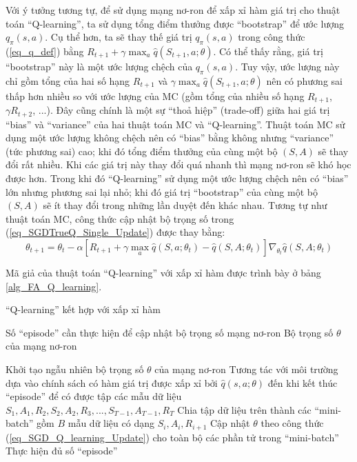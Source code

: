 	Với ý tưởng tương tự, để sử dụng mạng nơ-ron để xấp xỉ hàm giá trị cho thuật toán ``Q-learning'', ta sử dụng tổng điểm thưởng được ``bootstrap'' để ước lượng $q_{\pi}(s,a)$.
	Cụ thể hơn, ta sẽ thay thế giá trị $q_{\pi}(s,a)$ trong công thức (\ref{eq_q_def}) bằng $R_{t+1}+ \gamma \max_{a}\hat{q}(S_{t+1}, a;\theta)$.
	Có thể thấy rằng, giá trị ``bootstrap'' này là một ước lượng chệch của $q_{\pi}(s,a)$.
	Tuy vậy, ước lượng này chỉ gồm tổng của hai số hạng $R_{t+1}$ và $\gamma \max_{a}\hat{q}(S_{t+1}, a;\theta)$ nên có phương sai thấp hơn nhiều so với ước lượng của MC (gồm tổng của nhiều số hạng $R_{t+1}$, $\gamma R_{t+2}$, ...).
	Đây cũng chính là một sự ``thoả hiệp'' (trade-off) giữa hai giá trị ``bias'' và ``variance'' của hai thuật toán MC và ``Q-learning''.
	Thuật toán MC sử dụng một ước lượng không chệch nên có ``bias'' bằng không nhưng ``variance'' (tức phương sai) cao; khi đó tổng điểm thưởng của cùng một bộ $(S, A)$ sẽ thay đổi rất nhiều.
	Khi các giá trị này thay đổi quá nhanh thì mạng nơ-ron sẽ khó học được hơn.
	Trong khi đó ``Q-learning'' sử dụng một ước lượng chệch nên có ``bias'' lớn nhưng phương sai lại nhỏ; khi đó giá trị ``bootstrap'' của cùng một bộ $(S, A)$ sẽ ít thay đổi trong những lần duyệt đến khác nhau.
	Tương tự như thuật toán MC, công thức cập nhật bộ trọng số trong (\ref{eq_SGDTrueQ_Single_Update}) được thay bằng:
	\begin{equation}
		\label{eq_SGD_Q_learning_Update}
		\theta_{t+1} = \theta_t - \alpha \left[ R_{t+1} + \gamma \max_{a}\hat{q}(S, a;\theta_t) - \hat{q}(S,A;\theta_t) \right] \nabla_{\theta_t} \hat{q}(S, A;\theta_t)	
	\end{equation}
	
	Mã giả của thuật toán ``Q-learning'' với xấp xỉ hàm được trình bày ở bảng \ref{alg_FA_Q_learning}.
	\begin{algorithm}
		\caption{``Q-learning'' kết hợp với xấp xỉ hàm}
		\label{alg_FA_Q_learning}
		\begin{algorithmic}[1]
			\renewcommand{\algorithmicrequire}{\textbf{Đầu vào:}}
			\renewcommand{\algorithmicensure}{\textbf{Đầu ra:}}
			\algnewcommand{}
			\algnewcommand\Operation{\item[\algorithmicoperation]}
			
			\Require Số ``episode'' cần thực hiện để cập nhật bộ trọng số mạng nơ-ron
			\Ensure Bộ trọng số $\theta$ của mạng nơ-ron
			
			\Operation
			\State Khởi tạo ngẫu nhiên bộ trọng số $\theta$ của mạng nơ-ron
			\Repeat
				\State Tương tác với môi trường dựa vào chính sách có hàm giá trị được xấp xỉ bởi $\hat{q}(s, a;\theta)$ đến khi kết thúc ``episode'' để có được tập các mẫu dữ liệu $S_1, A_1, R_2, S_2, A_2, R_3, ..., S_{T-1}, A_{T-1}, R_{T}$
				\State Chia tập dữ liệu trên thành các ``mini-batch'' gồm $B$ mẫu dữ liệu có dạng $S_i, A_i, R_{i+1}$
					\State Cập nhật $\theta$ theo công thức (\ref{eq_SGD_Q_learning_Update}) cho toàn bộ các phần tử trong ``mini-batch''
				\EndFor
			\Until Thực hiện đủ số ``episode''
		\end{algorithmic}
	\end{algorithm}
	
